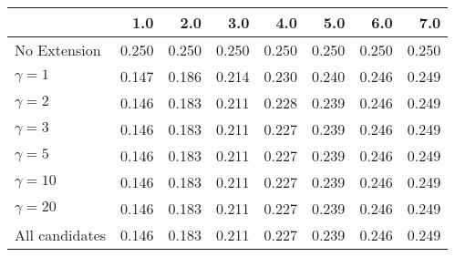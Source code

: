 \begin{tabular}{lrrrrrrr}
\toprule
{} &   1.0 &   2.0 &   3.0 &   4.0 &   5.0 &   6.0 &   7.0 \\
\midrule
No Extension   & 0.250 & 0.250 & 0.250 & 0.250 & 0.250 & 0.250 & 0.250 \\
$\gamma = 1$   & 0.147 & 0.186 & 0.214 & 0.230 & 0.240 & 0.246 & 0.249 \\
$\gamma = 2$   & 0.146 & 0.183 & 0.211 & 0.228 & 0.239 & 0.246 & 0.249 \\
$\gamma = 3$   & 0.146 & 0.183 & 0.211 & 0.227 & 0.239 & 0.246 & 0.249 \\
$\gamma = 5$   & 0.146 & 0.183 & 0.211 & 0.227 & 0.239 & 0.246 & 0.249 \\
$\gamma = 10$  & 0.146 & 0.183 & 0.211 & 0.227 & 0.239 & 0.246 & 0.249 \\
$\gamma = 20$  & 0.146 & 0.183 & 0.211 & 0.227 & 0.239 & 0.246 & 0.249 \\
All candidates & 0.146 & 0.183 & 0.211 & 0.227 & 0.239 & 0.246 & 0.249 \\
\bottomrule
\end{tabular}
